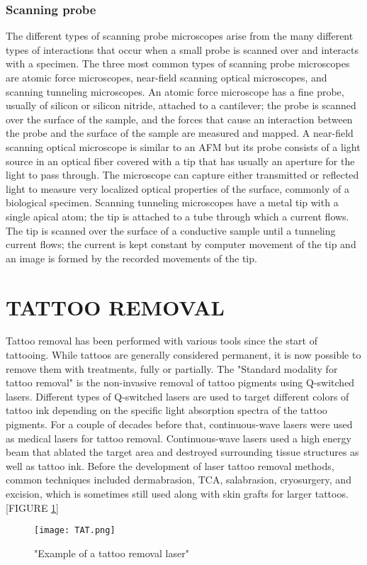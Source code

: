 \documentclass[12pt]{article}
\begin{document}
\subsubsection{Scanning probe}
The different types of scanning probe microscopes arise from the many different types of interactions that occur when a small probe is scanned over and interacts with a specimen.
The three most common types of scanning probe microscopes are atomic force microscopes, near-field scanning optical microscopes, and scanning tunneling microscopes.
An atomic force microscope has a fine probe, usually of silicon or silicon nitride, attached to a cantilever; the probe is scanned over the surface of the sample, and the forces that cause an interaction between the probe and the surface of the sample are measured and mapped.
A near-field scanning optical microscope is similar to an AFM but its probe consists of a light source in an optical fiber covered with a tip that has usually an aperture for the light to pass through.
The microscope can capture either transmitted or reflected light to measure very localized optical properties of the surface, commonly of a biological specimen.
Scanning tunneling microscopes have a metal tip with a single apical atom; the tip is attached to a tube through which a current flows.
The tip is scanned over the surface of a conductive sample until a tunneling current flows; the current is kept constant by computer movement of the tip and an image is formed by the recorded movements of the tip.
\clearpage
\section{TATTOO REMOVAL}
Tattoo removal has been performed with various tools since the start of tattooing.
While tattoos are generally considered permanent, it is now possible to remove them with treatments, fully or partially.
The "Standard modality for tattoo removal" is the non-invasive removal of tattoo pigments using Q-switched lasers.
Different types of Q-switched lasers are used to target different colors of tattoo ink depending on the specific light absorption spectra of the tattoo pigments.
For a couple of decades before that, continuous-wave lasers were used as medical lasers for tattoo removal.
Continuous-wave lasers used a high energy beam that ablated the target area and destroyed surrounding tissue structures as well as tattoo ink.
Before the development of laser tattoo removal methods, common techniques included dermabrasion, TCA, salabrasion, cryosurgery, and excision, which is sometimes still used along with skin grafts for larger tattoos.[FIGURE \ref{fig_TAT}]
\begin{figure}[h]
\centering
\texttt{[image: TAT.png]}
\caption{"Example of a tattoo removal laser"}
\label{fig_TAT}
\end{figure}
\end{document}
